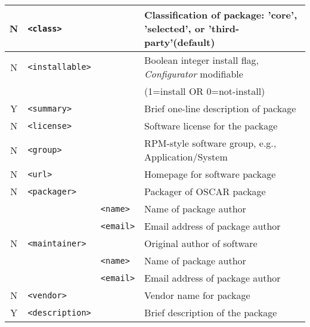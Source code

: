 \begin{table}[h!]
\begin{small}
\begin{center}
\begin{tabular}{|c|l|l|l|}
  N & \verb|<class>|   
		&   
		& Classification of package: {\small 'core', 'selected', or  
		   'third-party'(default)}
		\\ \hline

  N & \verb|<installable>|   
		&   
		& Boolean integer install flag, \emph{Configurator} modifiable 
		\\ 
    &
		&
		& (1=install OR 0=not-install)
		\\\hline

  Y & \verb|<summary>| 
		&   
		& Brief one-line description of package         
		\\ \hline

  N & \verb|<license>| 
		&   
		& Software license for the package              
		\\ \hline

  N & \verb|<group>|   
		&   
		& RPM-style software group, e.g., Application/System
		\\\hline

  N & \verb|<url>|     
		&   
		& Homepage for software package                 
		\\ \hline

  N & \verb|<packager>|
		&   
		& Packager of OSCAR package              
		\\\cline{3-4}
%
    & 
		& \verb|<name>|   
		& Name of package author                    
		\\\cline{3-4}
%
    & 
		& \verb|<email>|  
		& Email address of package author           
		\\\hline

  N & \verb|<maintainer>|
		& 
		& Original author of software            
		\\\cline{3-4}
%
    & 
		& \verb|<name>|   
		& Name of package author                    
		\\\cline{3-4}
%
    & 
		& \verb|<email>|  
		& Email address of package author           
		\\\hline

  N & \verb|<vendor>|
		& 
		& Vendor name for package
		\\\hline

  Y & \verb|<description>|
		&
		& Brief description of the package              
		\\ \hline


\end{tabular}
\end{center}
\end{small}
\end{table}
